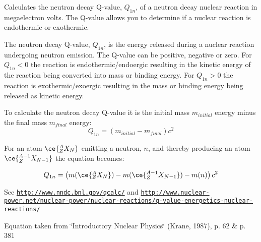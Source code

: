 Calculates the neutron decay Q-\/value, $Q_{1n}$, of a neutron decay nuclear reaction in megaelectron volts. The Q-\/value allows you to determine if a nuclear reaction is endothermic or exothermic. 

The neutron decay Q-\/value, $Q_{1n}$, is the energy released during a nuclear reaction undergoing neutron emission. The Q-\/value can be positive, negative or zero. For $Q_{1n} < 0$ the reaction is endothermic/endoergic resulting in the kinetic energy of the reaction being converted into mass or binding energy. For $Q_{1n} > 0$ the reaction is exothermic/exoergic resulting in the mass or binding energy being released as kinetic energy.

To calculate the neutron decay Q-\/value it is the initial mass $m_{initial}$ energy minus the final mass $m_{final}$ energy\+: \[Q_{1n} = \left ( m_{initial}-m_{final}\right ) c^2\]

For an atom $\ce{ ^{A}_{Z}X_{N} }$ emitting a neutron, $n$, and thereby producing an atom $\ce{ ^{A-1}_{Z}X_{N-1} }$ the equation becomes\+:

\[Q_{1n} = \left ( m(\ce{ ^{A}_{Z}X_{N} }) - m(\ce{ ^{A-1}_{Z}X_{N-1} }) - m(n) \right ) c^2\]

See \href{http://www.nndc.bnl.gov/qcalc/}{\tt http\+://www.\+nndc.\+bnl.\+gov/qcalc/} and \href{http://www.nuclear-power.net/nuclear-power/nuclear-reactions/q-value-energetics-nuclear-reactions/}{\tt http\+://www.\+nuclear-\/power.\+net/nuclear-\/power/nuclear-\/reactions/q-\/value-\/energetics-\/nuclear-\/reactions/}

Equation taken from \char`\"{}\+Introductory Nuclear Physics\char`\"{} (Krane, 1987), p. 62 \& p. 381


